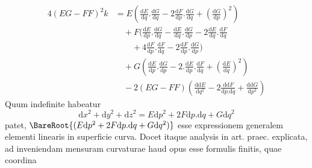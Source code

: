 \[
\begin{aligned}
4(EG-FF)^2k&=E(\tfrac{\mathrm{d}E}{\mathrm{d}q}\mathord{.}\tfrac{\mathrm{d}G}{\mathrm{d}q}-2\tfrac{\mathrm{d}F}{\mathrm{d}p}\mathord{.}\tfrac{\mathrm{d}G}{\mathrm{d}q}+(\tfrac{\mathrm{d}G}{\mathrm{d}p})^2)\\
&\quad+F(\tfrac{\mathrm{d}E}{\mathrm{d}p}\mathord{.}\tfrac{\mathrm{d}G}{\mathrm{d}q}-\tfrac{\mathrm{d}E}{\mathrm{d}q}\mathord{.}\tfrac{\mathrm{d}G}{\mathrm{d}p}-2\tfrac{\mathrm{d}E}{\mathrm{d}q}\mathord{.}\tfrac{\mathrm{d}F}{\mathrm{d}q}\\
&\qquad+4\tfrac{\mathrm{d}F}{\mathrm{d}p}\mathord{.}\tfrac{\mathrm{d}F}{\mathrm{d}q}-2\tfrac{\mathrm{d}F}{\mathrm{d}p}\mathord{.}\tfrac{\mathrm{d}G}{\mathrm{d}p})\\
&\quad+G(\tfrac{\mathrm{d}E}{\mathrm{d}p}\mathord{.}\tfrac{\mathrm{d}G}{\mathrm{d}p}-2\mathord{.}\tfrac{\mathrm{d}E}{\mathrm{d}p}\mathord{.}\tfrac{\mathrm{d}F}{\mathrm{d}q}+(\tfrac{\mathrm{d}E}{\mathrm{d}q})^2)\\
&\quad-2(EG-FF)(\tfrac{\mathrm{d}\mathrm{d}E}{\mathrm{d}q^2}-2\tfrac{\mathrm{d}\mathrm{d}F}{\mathrm{d}p\mathord{.}\mathrm{d}q}+\tfrac{\mathrm{d}\mathrm{d}G}{\mathrm{d}p^2})
\end{aligned}
\]
Quum indefinite habeatur
\[
\mathrm{d}x^2+\mathrm{d}y^2+\mathrm{d}z^2=E\mathrm{d}p^2+2F\mathrm{d}p\mathord{.}\mathrm{d}q+G\mathrm{d}q^2
\]
patet, \(\BareRoot{(E\mathrm{d}p^2+2F\mathrm{d}p\mathord{.}\mathrm{d}q+G\mathrm{d}q^2)}\) esse expressionem generalem elementi linearis in superficie curva. Docet itaque analysis in art. praec. explicata, ad inveniendam mensuram curvaturae haud opus esse formulis finitis, quae coordina%
